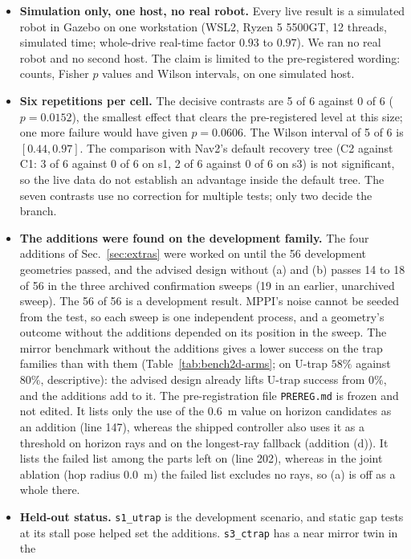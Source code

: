 \documentclass[journal]{IEEEtran}
\begin{document}
\begin{itemize}
\item \textbf{Simulation only, one host, no real robot.} Every live result is a
  simulated robot in Gazebo on one workstation (WSL2, Ryzen 5 5500GT, 12 threads, simulated
  time; whole-drive real-time factor $0.93$ to $0.97$). We
  ran no real robot and no second host. The claim is limited to the pre-registered
  wording: counts, Fisher $p$ values and Wilson intervals, on one simulated host.
\item \textbf{Six repetitions per cell.} The decisive contrasts are 5 of 6 against 0 of 6
  ($p=0.0152$), the smallest effect that clears the pre-registered level at this
  size; one more failure would have given $p=0.0606$. The Wilson interval of 5 of 6 is
  $[0.44, 0.97]$. The comparison with Nav2's default recovery tree (C2 against C1: 3 of 6
  against 0 of 6 on s1, 2 of 6 against 0 of 6 on s3) is not significant, so the live data do not
  establish an advantage inside the default tree. The seven contrasts use no correction for
  multiple tests; only two decide the branch.
\item \textbf{The additions were found on the development family.} The four additions of
  Sec.~\ref{sec:extras} were worked on until the 56 development geometries passed, and the
  advised design without (a) and (b) passes 14 to 18 of 56 in the three archived confirmation sweeps
  (19 in an earlier, unarchived sweep). The 56 of 56 is a development result. MPPI's
  noise cannot be seeded from the test, so each sweep is one independent process, and a geometry's
  outcome without the additions depended on its position in the sweep.
  The mirror benchmark without the additions gives a lower success on the trap families than with them
  (Table~\ref{tab:bench2d-arms}; on U-trap $58\%$ against $80\%$, descriptive): the advised design
  already lifts U-trap success from $0\%$, and the additions add to it.
  The pre-registration file \texttt{PREREG.md} is frozen and not edited. It lists only the use of the
  $0.6$~m value on horizon candidates as an addition (line 147), whereas the shipped controller also
  uses it as a threshold on horizon rays and on the longest-ray fallback (addition (d)). It lists the
  failed list among the parts left on (line 202), whereas in the joint ablation (hop radius $0.0$~m) the failed list excludes
  no rays, so (a) is off as a whole there.
\item \textbf{Held-out status.} \texttt{s1\_utrap} is the development scenario, and static gap tests at its
  stall pose helped set the additions. \texttt{s3\_ctrap} has a near mirror twin in the

\end{itemize}
\end{document}
